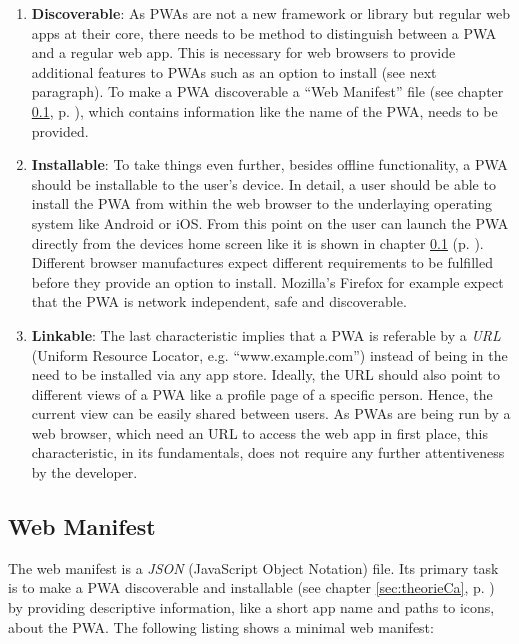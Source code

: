 \begin{enumerate}
	\item \textbf{Discoverable}: As PWAs are not a new framework or library but regular web apps at their core, there needs to be method to distinguish between a PWA and a regular web app. This is necessary for web browsers to provide additional features to PWAs such as an option to install (see next paragraph). To make a PWA discoverable a “Web Manifest” file (see chapter \ref{sec:theorieCb}, p. \pageref{sec:theorieCb}), which contains information like the name of the PWA, needs to be provided. \cite[p. 118]{liebelProgressiveWebApps2019}

	\item \textbf{Installable}: To take things even further, besides offline functionality, a PWA should be installable to the user’s device. In detail, a user should be able to install the PWA from within the web browser to the underlaying operating system like Android or iOS. From this point on the user can launch the PWA directly from the devices home screen like it is shown in chapter \ref{sec:theorieCb} (p. \pageref{sec:theorieCb}). Different browser manufactures expect different requirements to be fulfilled before they provide an option to install. Mozilla’s Firefox for example expect that the PWA is network independent, safe and discoverable. \cite{HowMakePWAs}

	\item \textbf{Linkable}: The last characteristic implies that a PWA is referable by a \textit{URL} (Uniform Resource Locator, e.g. “www.example.com”) instead of being in the need to be installed via any app store. Ideally, the URL should also point to different views of a PWA like a profile page of a specific person. Hence, the current view can be easily shared between users. As PWAs are being run by a web browser, which need an URL to access the web app in first place, this characteristic, in its fundamentals, does not require any further attentiveness by the developer. \cite[pp. 126-127]{liebelProgressiveWebApps2019}
\end{enumerate}

\subsection{Web Manifest}
\label{sec:theorieCb}

The web manifest is a \textit{JSON} (JavaScript Object Notation) file. Its primary task is to make a PWA discoverable and installable (see chapter \ref{sec:theorieCa}, p. \pageref{sec:theorieCa}) by providing descriptive information, like a short app name and paths to icons, about the PWA. 
The following listing shows a minimal web manifest:

